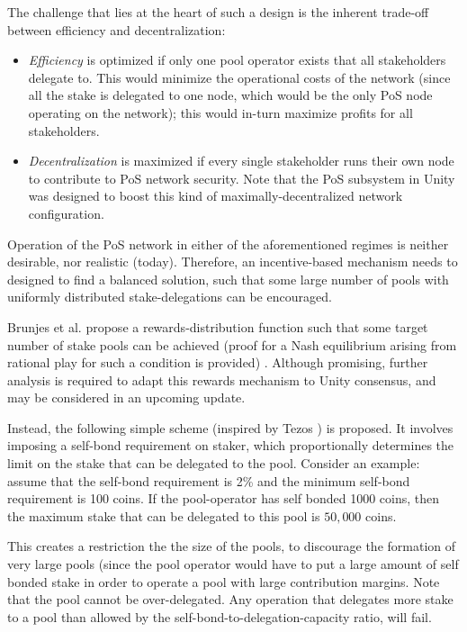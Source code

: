 The challenge that lies at the heart of such a design is the inherent trade-off between efficiency and decentralization: 
\begin{itemize}[label=--,nosep]
    \item \textit{Efficiency} is optimized if only one pool operator exists that all stakeholders delegate to. This would minimize the operational costs of the network (since all the stake is delegated to one node, which would be the only PoS node operating on the network); this would in-turn maximize profits for all stakeholders. 
    \item \textit{Decentralization} is maximized if every single stakeholder runs their own node to contribute to PoS network security. Note that the PoS subsystem in Unity was designed to boost this kind of maximally-decentralized network configuration. 
\end{itemize}

Operation of the PoS network in either of the aforementioned regimes is neither desirable, nor realistic (today). Therefore, an incentive-based mechanism needs to designed to find a balanced solution, such that some large number of pools with uniformly distributed stake-delegations can be encouraged. 

Brunjes et al. propose a rewards-distribution function such that some target number of stake pools can be achieved (proof for a Nash equilibrium arising from rational play for such a condition is provided) \cite{BKK+18}. Although promising, further analysis is required to adapt this rewards mechanism to Unity consensus, and may be considered in an upcoming update. 

Instead, the following simple scheme (inspired by Tezos \cite{Goo14}) is proposed. It involves imposing a self-bond requirement on staker, which proportionally determines the limit on the stake that can be delegated to the pool. Consider an example: assume that the self-bond requirement is 2\% and the minimum self-bond requirement is 100 coins. If the pool-operator has self bonded 1000 coins, then the maximum stake that can be delegated to this pool is $50,000$ coins.   

This creates a restriction the the size of the pools, to discourage the formation of very large pools (since the pool operator would have to put a large amount of self bonded stake in order to operate a pool with large contribution margins. Note that the pool cannot be over-delegated. Any operation that delegates more stake to a pool than allowed by the self-bond-to-delegation-capacity ratio, will fail. 

